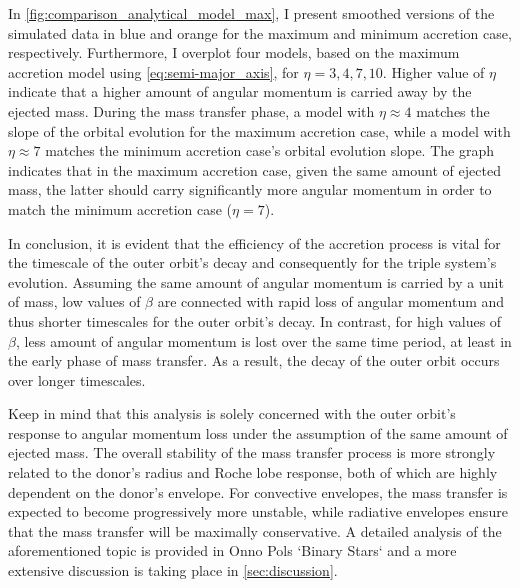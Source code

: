 In \cref{fig:comparison_analytical_model_max}, I present smoothed versions of the simulated data in blue and orange for the maximum and minimum accretion case, respectively. Furthermore, I overplot four models, based on the maximum accretion model using \cref{eq:semi-major_axis}, for $\eta = 3,4,7,10$. Higher value of $\eta$ indicate that a higher amount of angular momentum is carried away by the ejected mass. During the mass transfer phase, a model with $\eta \approx 4$ matches the slope of the orbital evolution for the maximum accretion case, while a model with $\eta \approx 7$ matches the minimum accretion case's orbital evolution slope. The graph indicates that in the maximum accretion case, given the same amount of ejected mass, the latter should carry significantly more angular momentum in order to match the minimum accretion case ($\eta = 7$). 

In conclusion, it is evident that the efficiency of the accretion process is vital for the timescale of the outer orbit's decay and consequently for the triple system's evolution. Assuming the same amount of angular momentum is carried by a unit of mass, low values of $\beta$ are connected with rapid loss of angular momentum and thus shorter timescales for the outer orbit's decay. In contrast, for high values of $\beta$, less amount of angular momentum is lost over the same time period, at least in the early phase of mass transfer. As a result, the decay of the outer orbit occurs over longer timescales.

Keep in mind that this analysis is solely concerned with the outer orbit's response to angular momentum loss under the assumption of the same amount of ejected mass. The overall stability of the mass transfer process is more strongly related to the donor's radius and Roche lobe response, both of which are highly dependent on the donor's envelope.  For convective envelopes, the mass transfer is expected to become progressively more unstable, while radiative envelopes ensure that the mass transfer will be maximally conservative. A detailed analysis of the aforementioned topic is provided in Onno Pols `Binary Stars` and a more extensive discussion is taking place in \cref{sec:discussion}.
